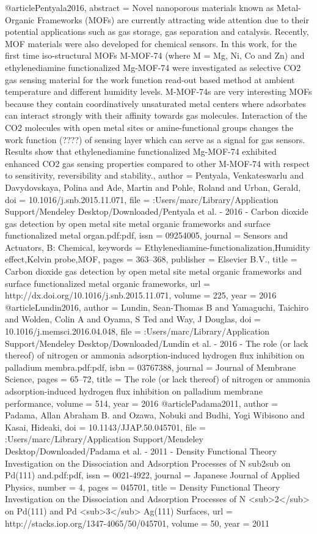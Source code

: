 @article{Pentyala2016,
abstract = {Novel nanoporous materials known as Metal-Organic Frameworks (MOFs) are currently attracting wide attention due to their potential applications such as gas storage, gas separation and catalysis. Recently, MOF materials were also developed for chemical sensors. In this work, for the first time iso-structural MOFs M-MOF-74 (where M = Mg, Ni, Co and Zn) and ethylenediamine functionalized Mg-MOF-74 were investigated as selective CO2 gas sensing material for the work function read-out based method at ambient temperature and different humidity levels. M-MOF-74s are very interesting MOFs because they contain coordinatively unsaturated metal centers where adsorbates can interact strongly with their affinity towards gas molecules. Interaction of the CO2 molecules with open metal sites or amine-functional groups changes the work function (????) of sensing layer which can serve as a signal for gas sensors. Results show that ethylenediamine functionalized Mg-MOF-74 exhibited enhanced CO2 gas sensing properties compared to other M-MOF-74 with respect to sensitivity, reversibility and stability.},
author = {Pentyala, Venkateswarlu and Davydovskaya, Polina and Ade, Martin and Pohle, Roland and Urban, Gerald},
doi = {10.1016/j.snb.2015.11.071},
file = {:Users/marc/Library/Application Support/Mendeley Desktop/Downloaded/Pentyala et al. - 2016 - Carbon dioxide gas detection by open metal site metal organic frameworks and surface functionalized metal organ.pdf:pdf},
issn = {09254005},
journal = {Sensors and Actuators, B: Chemical},
keywords = {Ethylenediamine-functionalization,Humidity effect,Kelvin probe,MOF},
pages = {363--368},
publisher = {Elsevier B.V.},
title = {{Carbon dioxide gas detection by open metal site metal organic frameworks and surface functionalized metal organic frameworks}},
url = {http://dx.doi.org/10.1016/j.snb.2015.11.071},
volume = {225},
year = {2016}
}
@article{Lundin2016,
author = {Lundin, Sean-Thomas B and Yamaguchi, Taichiro and Wolden, Colin A and Oyama, S Ted and Way, J Douglas},
doi = {10.1016/j.memsci.2016.04.048},
file = {:Users/marc/Library/Application Support/Mendeley Desktop/Downloaded/Lundin et al. - 2016 - The role (or lack thereof) of nitrogen or ammonia adsorption-induced hydrogen flux inhibition on palladium membra.pdf:pdf},
isbn = {03767388},
journal = {Journal of Membrane Science},
pages = {65--72},
title = {{The role (or lack thereof) of nitrogen or ammonia adsorption-induced hydrogen flux inhibition on palladium membrane performance}},
volume = {514},
year = {2016}
}
@article{Padama2011,
author = {Padama, Allan Abraham B. and Ozawa, Nobuki and Budhi, Yogi Wibisono and Kasai, Hideaki},
doi = {10.1143/JJAP.50.045701},
file = {:Users/marc/Library/Application Support/Mendeley Desktop/Downloaded/Padama et al. - 2011 - Density Functional Theory Investigation on the Dissociation and Adsorption Processes of N sub2sub on Pd(111) and.pdf:pdf},
issn = {0021-4922},
journal = {Japanese Journal of Applied Physics},
number = {4},
pages = {045701},
title = {{Density Functional Theory Investigation on the Dissociation and Adsorption Processes of N {\textless}sub{\textgreater}2{\textless}/sub{\textgreater} on Pd(111) and Pd {\textless}sub{\textgreater}3{\textless}/sub{\textgreater} Ag(111) Surfaces}},
url = {http://stacks.iop.org/1347-4065/50/045701},
volume = {50},
year = {2011}
}
